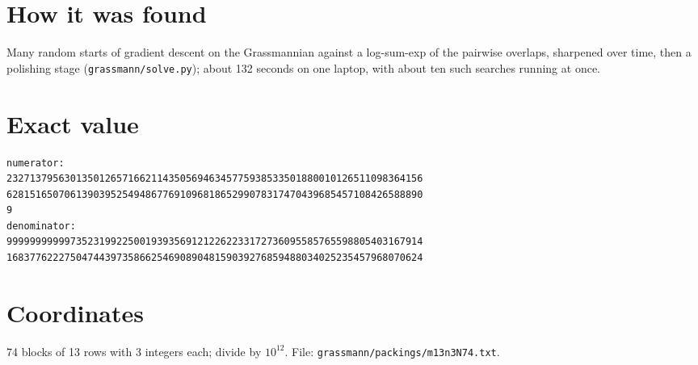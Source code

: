 \documentclass[11pt,a4paper]{article}
\begin{document}
\section{How it was found}
Many random starts of gradient descent on the Grassmannian against a log-sum-exp of the pairwise overlaps, sharpened over time, then a polishing stage (\texttt{grassmann/solve.py}); about 132 seconds on one laptop, with about ten such searches running at once.


\appendix
\section{Exact value}
{\small
\begin{verbatim}
numerator:
232713795630135012657166211435056946345775938533501880010126511098364156
628151650706139039525494867769109681865299078317470439685457108426588890
9
denominator:
999999999997352319922500193935691212262233172736095585765598805403167914
168377622275047443973586625469089048159039276859488034025235457968070624
\end{verbatim}}

\section{Coordinates}
74 blocks of 13 rows with 3 integers each; divide by $10^{12}$. File: \texttt{grassmann/packings/m13n3N74.txt}.
{\tiny
\begin{multicols}{3}
\end{multicols}}
\end{document}
